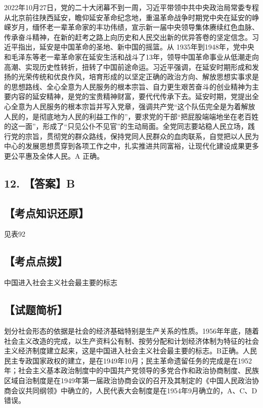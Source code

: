 \documentclass[UTF8,11pt]{ctexart}
\begin{document}
2022年10月27日，党的二十大闭幕不到一周，习近平带领中共中央政治局常委专程从北京前往陕西延安，瞻仰延安革命纪念地，重温革命战争时期党中央在延安的峥嵘岁月，缅怀老一辈革命家的丰功伟绩，宣示新一届中央领导集体赓续红色血脉、传承奋斗精神，在新的赶考之路上向历史和人民交出新的优异答卷的坚定信念。习近平指出，延安是中国革命的圣地、新中国的摇篮。从 1935年到1948年，党中央和毛泽东等老一辈革命家在延安生活和战斗了13年，领导中国革命事业从低潮走向高潮、实现历史性转折，扭转了中国前途命运。习近平强调，在延安时期形成和发扬的光荣传统和优良作风，培育形成的以坚定正确的政治方向、解放思想实事求是的思想路线、全心全意为人民服务的根本宗旨、自力更生艰苦奋斗的创业精神为主要内容的延安精神，是党的宝贵精神财富，要代代传承下去。延安时期，党提出全心全意为人民服务的根本宗旨并写入党章，强调共产党“这个队伍完全是为着解放人民的，是彻底地为人民的利益工作的”，要求党的干部“把屁股端端地坐在老百姓的这一面”，形成了“只见公仆不见官”的生动局面。全党同志要站稳人民立场，践行党的宗旨，贯彻党的群众路线，保持党同人民群众的血肉联系，自觉把以人民为中心的发展思想贯穿到各项工作之中，扎实推进共同富裕，让现代化建设成果更多更公平惠及全体人民。A 正确。


\subsection*{12. 【答案】B}

\subsection*{【考点知识还原】}

见表92


\subsection*{【考点点拨】}

中国进入社会主义社会最主要的标志


\subsection*{【试题简析】}

划分社会形态的依据是社会的经济基础特别是生产关系的性质。1956年年底，随着社会主义改造的完成，以生产资料公有制、按劳分配和计划经济体制为特征的社会主义经济制度建立起来，这是中国进入社会主义社会最主要的标志。B正确。人民民主专政国家政权的建立，是在1949年10月；民主革命遗留任务的完成是在1952年；社会主义基本政治制度中的中国共产党领导的多党合作和政治协商制度、民族区域自治制度是在1949年第一届政治协商会议的召开及其制定的《中国人民政治协商会议共同纲领》中确立的，人民代表大会制度是在1954年9月确立的，A、C、D错误。
\end{document}
